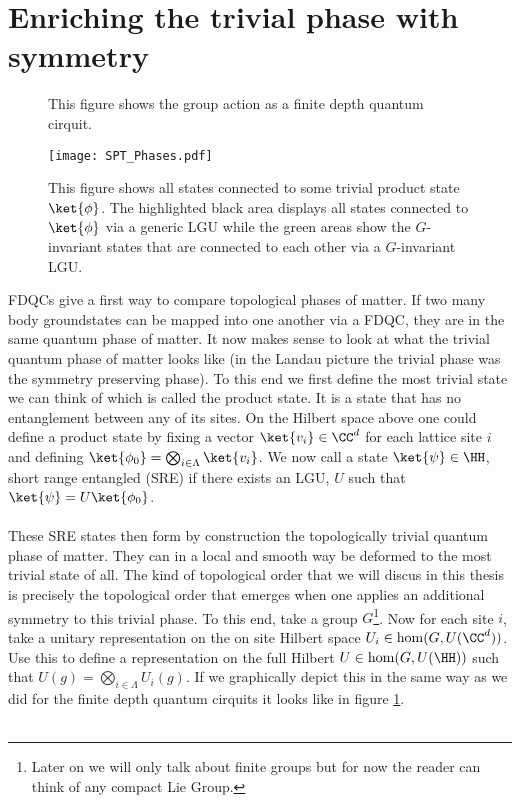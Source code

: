 \section{Enriching the trivial phase with symmetry}\label{sec:enriching-the-trivial-phase-with-symmetry}
\begin{figure}
	\centering
	\scalebox{0.9}{
		
	}
	\caption{This figure shows the group action as a finite depth quantum cirquit.}
	\label{fig:GroupActionQuantumCirquit}
\end{figure}
\begin{figure}
	\centering
	\texttt{[image: SPT\_Phases.pdf]}
	\caption{This figure shows all states connected to some trivial product state $\ket{\phi}$. The highlighted black area displays all states connected to $\ket{\phi}$ via a generic LGU while the green areas show the $G$-invariant states that are connected to each other via a $G$-invariant LGU.}
	\label{fig:ConnectedComponents}
\end{figure}
FDQCs give a first way to compare topological phases of matter. If two many body groundstates can be mapped into one another via a FDQC, they are in the same quantum phase of matter. It now makes sense to look at what the trivial quantum phase of matter looks like (in the Landau picture the trivial phase was the symmetry preserving phase). To this end we first define the most trivial state we can think of which is called the product state. It is a state that has no entanglement between any of its sites. On the Hilbert space above one could define a product state by fixing a vector $\ket{v_i}\in\CC^d$ for each lattice site $i$ and defining $\ket{\phi_0}=\bigotimes_{i\in\Lambda}\ket{v_i}$. We now call a state $\ket{\psi}\in\HH$, short range entangled (SRE) if there exists an LGU, $U$ such that $\ket{\psi}=U\ket{\phi_0}$.\\\\
These SRE states then form by construction the topologically trivial quantum phase of matter. They can in a local and smooth way be deformed to the most trivial state of all. The kind of topological order that we will discus in this thesis is precisely the topological order that emerges when one applies an additional symmetry to this trivial phase. To this end, take a group $G$\footnote{Later on we will only talk about finite groups but for now the reader can think of any compact Lie Group.}. Now for each site $i$, take a unitary representation on the on site Hilbert space $U_i\in\hom(G,U(\CC^d))$. Use this to define a representation on the full Hilbert $U\in\hom(G,U(\HH))$ such that $U(g)=\bigotimes_{i\in\Lambda}U_i(g)$. If we graphically depict this in the same way as we did for the finite depth quantum cirquits it looks like in figure \ref{fig:GroupActionQuantumCirquit}.\\\\
